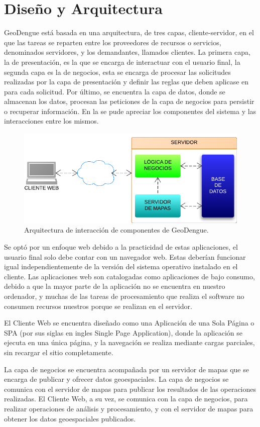 \section{Diseño y Arquitectura}
GeoDengue está basada en una arquitectura, de tres capas, cliente-servidor, en el que las tareas
se reparten entre los proveedores de recursos o servicios, denominados servidores, y los
demandantes, llamados clientes. La primera capa, la de presentación, es la que se encarga de
interactuar con el usuario final, la segunda capa es la de negocios, esta se encarga de procesar
las solicitudes realizadas por la capa de presentación y definir las reglas que deben aplicase en
para cada solicitud. Por último, se encuentra la capa de datos, donde se almacenan los datos,
procesan las peticiones de la capa de negocios para persistir o recuperar información. En la
 se pude apreciar los componentes del sistema y las interacciones
entre los mismos.

\begin{figure}[!htpb]
\centering
\includegraphics[width=1\textwidth]{capitulo-5/graphics/arquitectura-completa.png}
\caption{\label{fig:arquitectura-completa}Arquitectura de interacción de componentes de GeoDengue.}
\end{figure}

Se optó por un enfoque web debido a la practicidad de estas aplicaciones, el usuario final solo
debe contar con un navegador web. Estas deberían funcionar igual independientemente de la versión
del sistema operativo instalado en el cliente. Las aplicaciones web son catalogadas como
aplicaciones de bajo consumo, debido a que la mayor parte de la aplicación no se encuentra en
nuestro ordenador, y muchas de las tareas de procesamiento que realiza el software no consumen
recursos nuestros porque se realizan en el servidor.

El Cliente Web se encuentra diseñado como una Aplicación de una Sola Página o SPA (por sus siglas
en ingles Single Page Application), donde la aplicación se ejecuta en una única página, y la
navegación se realiza mediante cargas parciales, sin recargar el sitio completamente.

La capa de negocios se encuentra acompañada por un servidor de mapas que se encarga de publicar y
ofrecer datos geoespaciales. La capa de negocios se comunica con el servidor de mapas para
publicar los resultados de las operaciones realizadas. El Cliente Web, a su vez, se comunica con
la capa de negocios, para realizar operaciones de análisis y procesamiento, y con el servidor de
mapas para obtener los datos geoespaciales publicados.

